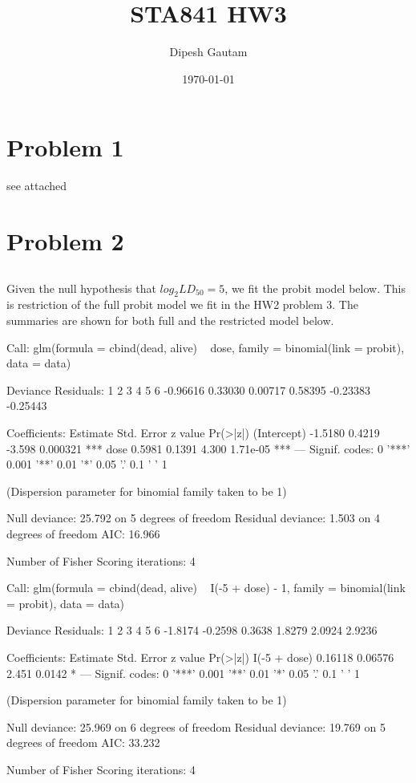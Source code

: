 \documentclass{article}
\begin{document}

\title{STA841 HW3}
\author{Dipesh Gautam}
\date{\today}
\maketitle


\section{Problem 1}
see attached


\section{Problem 2}
\subsection{}
Given the null hypothesis that $log_2LD_{50}=5$, we fit the probit model below. This is restriction of the full probit model we fit in the HW2 problem 3. The summaries are shown for both full and the restricted model below.
\begin{Schunk}
\begin{Soutput}
Call:
glm(formula = cbind(dead, alive) ~ dose, family = binomial(link = probit), 
    data = data)

Deviance Residuals: 
       1         2         3         4         5         6  
-0.96616   0.33030   0.00717   0.58395  -0.23383  -0.25443  

Coefficients:
            Estimate Std. Error z value Pr(>|z|)    
(Intercept)  -1.5180     0.4219  -3.598 0.000321 ***
dose          0.5981     0.1391   4.300 1.71e-05 ***
---
Signif. codes:  0 '***' 0.001 '**' 0.01 '*' 0.05 '.' 0.1 ' ' 1

(Dispersion parameter for binomial family taken to be 1)

    Null deviance: 25.792  on 5  degrees of freedom
Residual deviance:  1.503  on 4  degrees of freedom
AIC: 16.966

Number of Fisher Scoring iterations: 4
\end{Soutput}
\begin{Soutput}
Call:
glm(formula = cbind(dead, alive) ~ I(-5 + dose) - 1, family = binomial(link = probit), 
    data = data)

Deviance Residuals: 
      1        2        3        4        5        6  
-1.8174  -0.2598   0.3638   1.8279   2.0924   2.9236  

Coefficients:
             Estimate Std. Error z value Pr(>|z|)  
I(-5 + dose)  0.16118    0.06576   2.451   0.0142 *
---
Signif. codes:  0 '***' 0.001 '**' 0.01 '*' 0.05 '.' 0.1 ' ' 1

(Dispersion parameter for binomial family taken to be 1)

    Null deviance: 25.969  on 6  degrees of freedom
Residual deviance: 19.769  on 5  degrees of freedom
AIC: 33.232

Number of Fisher Scoring iterations: 4
\end{Soutput}
\end{Schunk}
\end{document}
